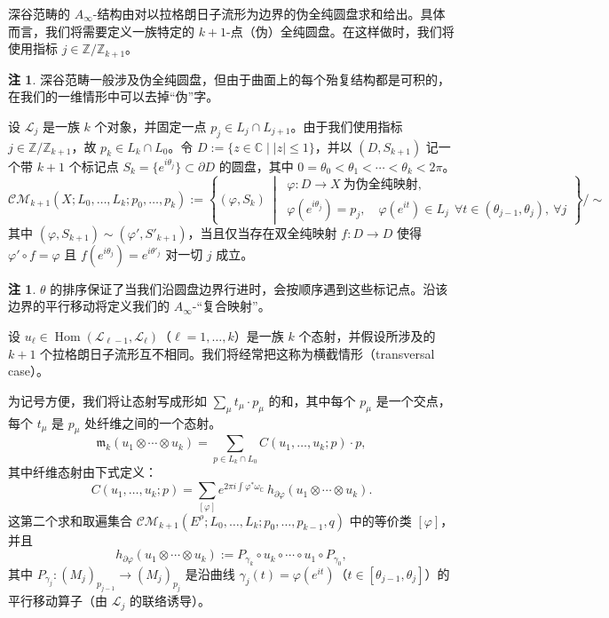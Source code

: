 \documentclass[11pt,a4paper]{article}
\theoremstyle{plain}
\theoremstyle{definition}
\newtheorem{remark}[theorem]{注}
\begin{document}
深谷范畴的 $A_\infty$-结构由对以拉格朗日子流形为边界的伪全纯圆盘求和给出。具体而言，我们将需要定义一族特定的 $k+1$-点（伪）全纯圆盘。在这样做时，我们将使用指标 $j\in\mathbb{Z}/\mathbb{Z}_{k+1}$。

\begin{remark}
深谷范畴一般涉及伪全纯圆盘，但由于曲面上的每个殆复结构都是可积的，在我们的一维情形中可以去掉“伪”字。
\end{remark}

设 $\mathcal{L}_j$ 是一族 $k$ 个对象，并固定一点 $p_j\in L_j\cap L_{j+1}$。由于我们使用指标 $j\in\mathbb{Z}/\mathbb{Z}_{k+1}$，故 $p_k\in L_k\cap L_0$。令 $D:=\{z\in\mathbb{C}\mid |z|\le 1\}$，并以 $(D,S_{k+1})$ 记一个带 $k+1$ 个标记点 $S_k=\{e^{i\theta_j}\}\subset\partial D$ 的圆盘，其中 $0=\theta_0<\theta_1<\cdots<\theta_k<2\pi$。
{\small
\[
\mathcal{CM}_{k+1}(X;L_0,\dots,L_k;p_0,\dots,p_k):=\left\{(\varphi,S_k)\ \middle|\ 
\begin{array}{l}
\varphi\colon D\to X\ \text{为伪全纯映射},\\
\varphi(e^{i\theta_j})=p_j,\quad \varphi(e^{it})\in L_j\ \ \forall t\in(\theta_{j-1},\theta_j),\ \forall j
\end{array}
\right\}\Big/\!\sim
\]
}
其中 $(\varphi,S_{k+1})\sim(\varphi',S'_{k+1})$，当且仅当存在双全纯映射 $f\colon D\to D$ 使得 $\varphi'\circ f=\varphi$ 且 $f(e^{i\theta_j})=e^{i\theta'_j}$ 对一切 $j$ 成立。

\begin{remark}
$\theta$ 的排序保证了当我们沿圆盘边界行进时，会按顺序遇到这些标记点。沿该边界的平行移动将定义我们的 $A_\infty$-“复合映射”。
\end{remark}

设 $u_\ell\in\operatorname{Hom}(\mathcal{L}_{\ell-1},\mathcal{L}_\ell)$（$\ell=1,\dots,k$）是一族 $k$ 个态射，并假设所涉及的 $k+1$ 个拉格朗日子流形互不相同。我们将经常把这称为横截情形（transversal case）。

为记号方便，我们将让态射写成形如 $\sum_\mu t_\mu\cdot p_\mu$ 的和，其中每个 $p_\mu$ 是一个交点，每个 $t_\mu$ 是 $p_\mu$ 处纤维之间的一个态射。
\[
\mathfrak{m}_k(u_1\otimes\cdots\otimes u_k)=\sum_{p\in L_k\cap L_0}C(u_1,\dots,u_k;p)\cdot p,
\]
其中纤维态射由下式定义：
\[
C(u_1,\dots,u_k;p)=\sum_{[\varphi]}e^{2\pi i\int\varphi^*\omega_{\mathbb{C}}}\,h_{\partial\varphi}(u_1\otimes\cdots\otimes u_k).
\]
这第二个求和取遍集合 $\mathcal{CM}_{k+1}(E^\rho;L_0,\dots,L_k;p_0,\dots,p_{k-1},q)$ 中的等价类 $[\varphi]$，并且
\[
h_{\partial\varphi}(u_1\otimes\cdots\otimes u_k):=P_{\gamma_k}\circ u_k\circ\cdots\circ u_1\circ P_{\gamma_0},
\]
其中 $P_{\gamma_j}\colon(M_j)_{p_{j-1}}\to(M_j)_{p_j}$ 是沿曲线 $\gamma_j(t)=\varphi(e^{it})$（$t\in[\theta_{j-1},\theta_j]$）的平行移动算子（由 $\mathcal{L}_j$ 的联络诱导）。
\end{document}
